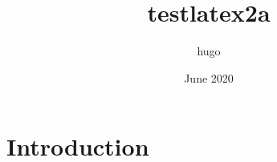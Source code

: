 \documentclass{article}
\title{testlatex2a}
\author{hugo }
\date{June 2020}
\begin{document}
\maketitle

\section{Introduction}
\end{document}
